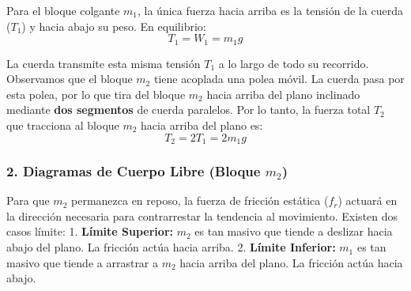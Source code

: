 \documentclass[12pt, a4paper]{article}
\begin{document}
Para el bloque colgante $m_1$, la única fuerza hacia arriba es la tensión de la cuerda ($T_1$) y hacia abajo su peso. En equilibrio:
$$ T_1 = W_1 = m_1 g $$

La cuerda transmite esta misma tensión $T_1$ a lo largo de todo su recorrido. Observamos que el bloque $m_2$ tiene acoplada una polea móvil. La cuerda pasa por esta polea, por lo que tira del bloque $m_2$ hacia arriba del plano inclinado mediante \textbf{dos segmentos} de cuerda paralelos. 
Por lo tanto, la fuerza total $T_2$ que tracciona al bloque $m_2$ hacia arriba del plano es:
$$ T_2 = 2 T_1 = 2 m_1 g $$

\subsubsection*{2. Diagramas de Cuerpo Libre (Bloque $m_2$)}
Para que $m_2$ permanezca en reposo, la fuerza de fricción estática ($f_r$) actuará en la dirección necesaria para contrarrestar la tendencia al movimiento. Existen dos casos límite:
1. \textbf{Límite Superior:} $m_2$ es tan masivo que tiende a deslizar hacia abajo del plano. La fricción actúa hacia arriba.
2. \textbf{Límite Inferior:} $m_1$ es tan masivo que tiende a arrastrar a $m_2$ hacia arriba del plano. La fricción actúa hacia abajo.
\end{document}

